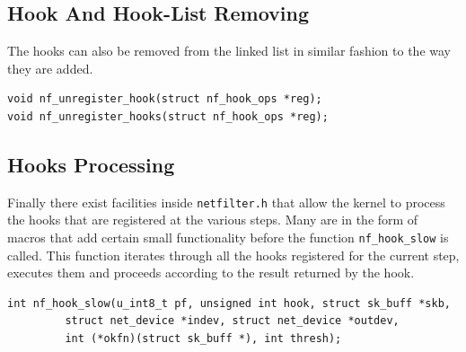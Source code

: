 \subsection{Hook And Hook-List Removing}\label{hook_removing}
The hooks can also be removed from the linked list in similar fashion to the way they are added.

\begin{lstlisting}
void nf_unregister_hook(struct nf_hook_ops *reg);
void nf_unregister_hooks(struct nf_hook_ops *reg);
\end{lstlisting}

\subsection{Hooks Processing}\label{hooks_processing}
Finally there exist facilities inside \verb|netfilter.h| that allow the kernel to process the hooks that are registered at the various steps. Many are in the form of macros that add certain small functionality before the function \verb|nf_hook_slow| is called. This function iterates through all the hooks registered for the current step, executes them and proceeds according to the result returned by the hook.

\begin{lstlisting}
int nf_hook_slow(u_int8_t pf, unsigned int hook, struct sk_buff *skb,
		 struct net_device *indev, struct net_device *outdev,
		 int (*okfn)(struct sk_buff *), int thresh);
\end{lstlisting}


